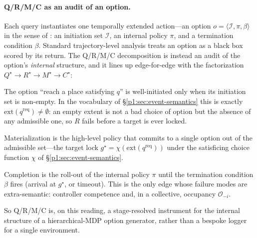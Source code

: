 \documentclass{article}
\begin{document}
\paragraph{Q/R/M/C as an audit of an option.}
Each query instantiates one temporally extended action---an option
$o=\langle \mathcal{I},\pi,\beta\rangle$ in the sense of
\citet{sutton1999between}: an initiation set $\mathcal{I}$, an internal
policy $\pi$, and a termination condition $\beta$. Standard
trajectory-level analysis treats an option as a black box scored by its
return. The Q/R/M/C decomposition is instead an audit of the option's
\emph{internal} structure, and it lines up edge-for-edge with the
factorization $Q^\star\!\rightarrow\!R^\star\!\rightarrow\!M^\star\!\rightarrow\!C^\star$:
\begin{description}[leftmargin=14pt,topsep=2pt,itemsep=2pt]
\item[$Q^\star\!\rightarrow\!R^\star$ (initiation).] The option ``reach a place satisfying $q$'' is well-initiated only when its initiation set is non-empty. In the vocabulary of \S\ref{p1:sec:event-semantics} this is exactly $\mathrm{ext}(q^{\mathrm{req}})\neq\emptyset$: an empty extent is not a bad choice of option but the absence of any admissible one, so $R$ fails before a target is ever locked.
\item[$R^\star\!\rightarrow\!M^\star$ (policy over options).] Materialization is the high-level policy that commits to a single option out of the admissible set---the target lock $g^\star=\chi(\mathrm{ext}(q^{\mathrm{req}}))$ under the satisficing choice function $\chi$ of \S\ref{p1:sec:event-semantics}.
\item[$M^\star\!\rightarrow\!C^\star$ (execution to termination).] Completion is the roll-out of the internal policy $\pi$ until the termination condition $\beta$ fires (arrival at $g^\star$, or timeout). This is the only edge whose failure modes are extra-semantic: controller competence and, in a collective, occupancy $\mathcal{O}_{-i}$.
\end{description}
So Q/R/M/C is, on this reading, a stage-resolved instrument for the
internal structure of a hierarchical-MDP option generator, rather than
a bespoke logger for a single environment.
\end{document}
